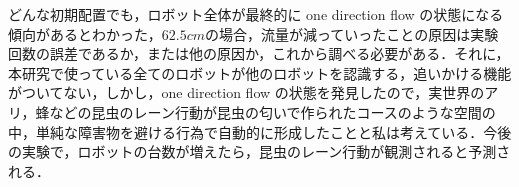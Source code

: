 どんな初期配置でも，ロボット全体が最終的に one direction flow の状態になる傾向があるとわかった，$62.5cm$の場合，流量が減っていったことの原因は実験回数の誤差であるか，または他の原因か，これから調べる必要がある．それに，本研究で使っている全てのロボットが他のロボットを認識する，追いかける機能がついてない，しかし，one direction flow の状態を発見したので，実世界のアリ，蜂などの昆虫のレーン行動が昆虫の匂いで作られたコースのような空間の中，単純な障害物を避ける行為で自動的に形成したことと私は考えている．今後の実験で，ロボットの台数が増えたら，昆虫のレーン行動が観測されると予測される．
